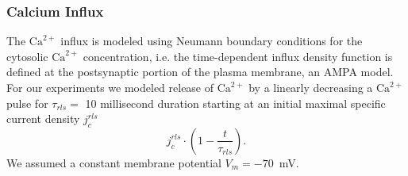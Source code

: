 \documentclass[12pt]{article}
\begin{document}
\subsubsection*{Calcium Influx} The $\textrm{Ca}^{2+}$ influx is modeled using Neumann boundary conditions for the cytosolic $\textrm{Ca}^{2+}$ concentration, i.e. the time-dependent influx density function is defined at the postsynaptic portion of the plasma membrane, an AMPA model. For our experiments we modeled release of $\textrm{Ca}^{2+}$ by a linearly decreasing a $\textrm{Ca}^{2+}$ pulse for $\tau_{rls}=$ 10 millisecond duration starting at an initial maximal specific current density $j_c^{rls}$ 
\begin{equation}
    j_c^{rls}\cdot\left(1-\frac{t}{\tau_{rls}}\right).
\end{equation}
We assumed a constant membrane potential $V_m = -70$\ mV. %
\end{document}

